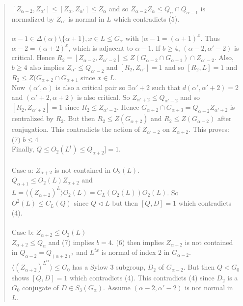 \begin{quote}
$[Z_{\alpha - 2}, Z_{\alpha'}] \leq [Z_{\alpha}, Z_{\alpha'}] \leq Z_{\alpha}$ and so $Z_{\alpha - 2} Z_{\alpha} \leq Q_{\alpha} \cap Q_{\alpha - 1}$ is normalized by $Z_{\alpha'}$ is normal in $L$ which contradicts (5).\\
\\
$\alpha - 1 \in \Delta(\alpha) \setminus \{ \alpha + 1 \}, x \in L \leq G_{\alpha}$ with $(\alpha - 1 = (\alpha + 1)^x$.  Thus
$\alpha - 2 = (\alpha + 2)^x$, which is adjacent to $\alpha - 1$.  If $b \geq 4$, $(\alpha - 2, \alpha' - 2)$ is critical.  Hence
$R_2= [Z_{\alpha - 2}, Z_{\alpha' - 2}] \leq Z(G_{\alpha - 2} \cap G_{\alpha - 1}) \cap Z_{\alpha' - 2}$.  Also,
$b \geq 4$ also implies $Z_{\alpha'} \leq Q_{\alpha' - 2}$ and $[R_2, Z_{\alpha'}] = 1$ and so $[R_2 , L] = 1$ and
$R_2 \leq Z(G_{\alpha + 2} \cap G_{\alpha + 1}$ since $x \in L$.\\
Now $(\alpha', \alpha)$ is also a critical pair so $\exists \alpha' +2$ such that $d(\alpha', \alpha' + 2) = 2$ and
$(\alpha' +2, \alpha + 2)$ is also critical. So $Z_{\alpha' + 2} \leq Q_{\alpha' - 2}$ and so
$[R_2, Z_{\alpha' +2}] = 1$ since $R_2 \leq Z_{\alpha' - 2}$.  Hence $G_{\alpha + 2} \cap G_{\alpha + 3} = Q_{\alpha +2}Z_{\alpha'+2}$
is centralized by $R_2$.  But then $R_2 \leq Z(G_{\alpha + 2})$ and  $R_2 \leq Z(G_{\alpha - 2})$ after conjugation.  This contradicts
the action of $Z_{\alpha' - 2}$ on  $Z_{\alpha + 2}$.
This proves:\\
(7) $b \leq 4$
\\
Finally, $Q \leq O_2(L^t) \leq Q_{\alpha +2}] =  1$.\\
\\
Case a: $Z_{\alpha + 2}$ is not contained in $O_2(L)$.\\
$Q_{\alpha + 1} \leq O_2(L) Z_{\alpha + 2}$ and $L= \langle (Z_{\alpha + 2})^L \rangle O_2(L) = C_L(O_2(L)) O_2(L)$.
So $O^2(L) \leq C_L(Q)$ since $Q \lhd L$ but then $[Q, D] = 1$ which contradicts (4).
\\
\\
Case b: $Z_{\alpha + 2} \leq O_2(L)$
\\
$Z_{\alpha + 2} \leq Q_{\alpha}$ and (7) implies $b=4$.  (6) then implies
$Z_{\alpha + 2}$ is not contained in $Q_{\alpha - 2}= Q_{(\alpha + 2)^x}$ and $L^{tx}$ is normal of index $2$ in $G_{\alpha - 2}$.
$\langle (Z_{\alpha + 2})^{L^{tx}} \rangle \leq G_0$ has a Sylow $3$ subgroup, $D_2$ of $G_{\alpha - 2}$. But then
$Q \lhd G_0$ shows $[Q, D] = 1$ which contradicts (4).
This contradicts (4) since $D_2$ is a $G_0$ conjugate of $D \in S_3(G_{\alpha})$.
Assume $(\alpha - 2, \alpha' - 2)$ is not normal in $L$.
\end{quote}
